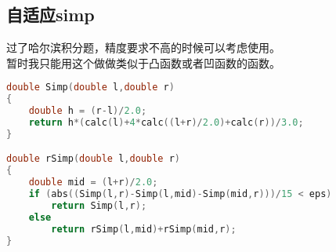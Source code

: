 \subsection{自适应simp}
    过了哈尔滨积分题，精度要求不高的时候可以考虑使用。\\
    暂时我只能用这个做做类似于凸函数或者凹函数的函数。
    \begin{lstlisting}[language=c++]
double Simp(double l,double r)
{
    double h = (r-l)/2.0;
    return h*(calc(l)+4*calc((l+r)/2.0)+calc(r))/3.0;
}

double rSimp(double l,double r)
{
    double mid = (l+r)/2.0;
    if (abs((Simp(l,r)-Simp(l,mid)-Simp(mid,r)))/15 < eps)
        return Simp(l,r);
    else
        return rSimp(l,mid)+rSimp(mid,r);
}
    \end{lstlisting}
